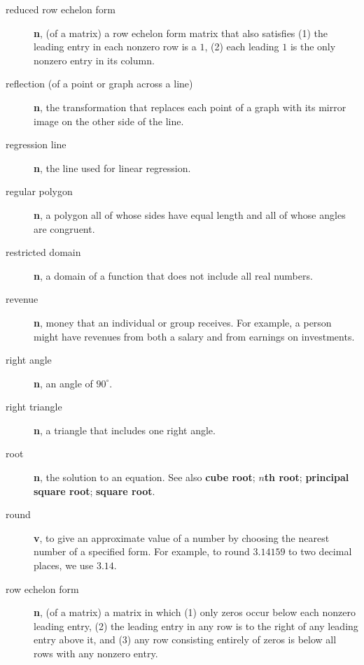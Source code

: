 \documentclass[10pt,]{book}
\newcommand{\terminology}[1]{\textbf{#1}}
\theoremstyle{plain}
\theoremstyle{definition}
\theoremstyle{definition}
\theoremstyle{definition}
\numberwithin{equation}{part}
\newcommand\degree[0]{^{\circ}}
\begin{document}
\begin{description}
\item[{reduced row echelon form}]\hypertarget{li-776}{}\terminology{n}, (of a matrix) a row echelon form matrix that also satisfies (1) the leading entry in each nonzero row is a \(1\), (2) each leading \(1\) is the only nonzero entry in its column.%
\item[{reflection (of a point or graph across a line)}]\hypertarget{li-777}{}\terminology{n}, the transformation that replaces each point of a graph with its mirror image on the other side of the line.%
\item[{regression line}]\hypertarget{li-778}{}\terminology{n}, the line used for linear regression.%
\item[{regular polygon}]\hypertarget{li-779}{}\terminology{n}, a polygon all of whose sides have equal length and all of whose angles are congruent.%
\item[{restricted domain}]\hypertarget{li-780}{}\terminology{n}, a domain of a function that does not include all real numbers.%
\item[{revenue}]\hypertarget{li-781}{}\terminology{n}, money that an individual or group receives. For example, a person might have revenues from both a salary and from earnings on investments.%
\item[{right angle}]\hypertarget{li-782}{}\terminology{n}, an angle of \(90\degree\).%
\item[{right triangle}]\hypertarget{li-783}{}\terminology{n}, a triangle that includes one right angle.%
\item[{root}]\hypertarget{li-784}{}\terminology{n}, the solution to an equation. See also \terminology{cube root}; \terminology{\(n\)th root}; \terminology{principal square root}; \terminology{square root}.%
\item[{round}]\hypertarget{li-785}{}\terminology{v}, to give an approximate value of a number by choosing the nearest number of a specified form. For example, to round \(3.14159\) to two decimal places, we use \(3.14\).%
\item[{row echelon form}]\hypertarget{li-786}{}\terminology{n}, (of a matrix) a matrix in which (1) only zeros occur below each nonzero leading entry, (2) the leading entry in any row is to the right of any leading entry above it, and (3) any row consisting entirely of zeros is below all rows with any nonzero entry.%
\end{description}
%
\typeout{************************************************}
\typeout{************************************************}
\end{document}
